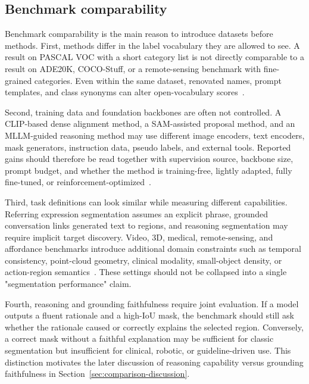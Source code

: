 \subsection{Benchmark comparability}

Benchmark comparability is the main reason to introduce datasets before methods. First, methods differ in the label vocabulary they are allowed to see. A result on PASCAL VOC with a short category list is not directly comparable to a result on ADE20K, COCO-Stuff, or a remote-sensing benchmark with fine-grained categories. Even within the same dataset, renovated names, prompt templates, and class synonyms can alter open-vocabulary scores~\citep{hhuangRenovatingNamesOpenvocabulary2024,ybenigmimFlossFreeLunch2025}.

Second, training data and foundation backbones are often not controlled. A CLIP-based dense alignment method, a SAM-assisted proposal method, and an MLLM-guided reasoning method may use different image encoders, text encoders, mask generators, instruction data, pseudo labels, and external tools. Reported gains should therefore be read together with supervision source, backbone size, prompt budget, and whether the method is training-free, lightly adapted, fully fine-tuned, or reinforcement-optimized~\citep{xshanOpenvocabularySemanticSegmentation2024,shinhOpenvocabularySemanticSegmentation2024,zhouReasoningImplicitSelfsupervised2026,zhuLensLearningSegment2026}.

Third, task definitions can look similar while measuring different capabilities. Referring expression segmentation assumes an explicit phrase, grounded conversation links generated text to regions, and reasoning segmentation may require implicit target discovery. Video, 3D, medical, remote-sensing, and affordance benchmarks introduce additional domain constraints such as temporal consistency, point-cloud geometry, clinical modality, small-object density, or action-region semantics~\citep{atharVicasDatasetCombining2025,chen3DDRESDetailed3D2026,yanMedreasonerReinforcementLearning2026,libExploringEfficientOpenvocabulary2026,wangAffordancer1ReinforcementLearning2026}. These settings should not be collapsed into a single "segmentation performance" claim.

Fourth, reasoning and grounding faithfulness require joint evaluation. If a model outputs a fluent rationale and a high-IoU mask, the benchmark should still ask whether the rationale caused or correctly explains the selected region. Conversely, a correct mask without a faithful explanation may be sufficient for classic segmentation but insufficient for clinical, robotic, or guideline-driven use. This distinction motivates the later discussion of reasoning capability versus grounding faithfulness in Section~\ref{sec:comparison-discussion}.
